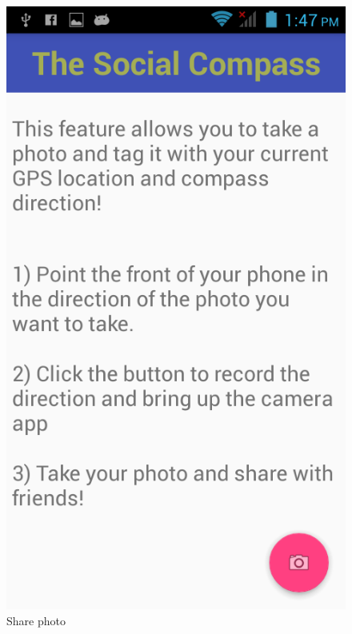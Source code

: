 \documentclass[12pt]{article}
\begin{document}
\begin{figure}[H]
\begin{minipage}[b]{.3\textwidth}
        \includegraphics[scale=1.2, width=\linewidth]{photo1.png}  
        \caption{Share photo}  
    \end{minipage} 
    \hfill
    \begin{minipage}[b]{.3\textwidth}  
        \centering  

\end{minipage}
\end{figure}
\end{document}
